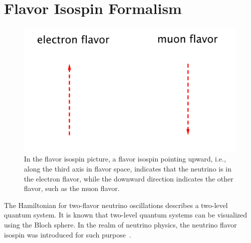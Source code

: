 \section{\label{chap:basics-sec:flavor-isospin-pic}Flavor Isospin Formalism}


\begin{figure}
    \centering
    \vspace*{-10pt}
    \includegraphics[width=\textwidth]{chapters/assets/basics/flavor-isospin-illus}
    \caption{In the flavor isospin picture, a flavor isospin pointing upward, i.e., along the third axis in flavor space, indicates that the neutrino is in the electron flavor, while the downward direction indicates the other flavor, such as the muon flavor.}
    \label{chap:basics-sec:flavor-isospin-pic-fig:flavor-isospin-illus}
\end{figure}

The Hamiltonian for two-flavor neutrino oscillations describes a two-level quantum system. It is known that two-level quantum systems can be visualized using the Bloch sphere. In the realm of neutrino physics, the neutrino flavor isospin was introduced for such purpose~\cite{Duan2006b}.


